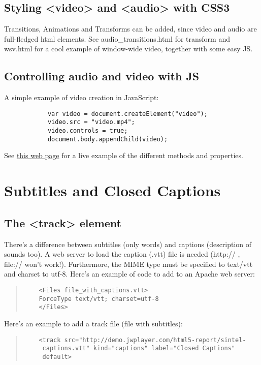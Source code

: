 \documentclass[a4paper,11pt]{book}
\begin{document}
        \subsection{Styling <video> and <audio> with CSS3}
        Transitions, Animations and Transforms can be added, since video and audio are full-fledged html elements.
        See audio\_transitions.html for transform and wsv.html for a cool example of window-wide video, together with some easy JS.

        \subsection{Controlling audio and video with JS}
        A simple example of video creation in JavaScript:
        \begin{verbatim}
            var video = document.createElement("video");
            video.src = "video.mp4";
            video.controls = true;
            document.body.appendChild(video);
        \end{verbatim}
        See \href{http://www.w3.org/2010/05/video/mediaevents.html}{this web page} for a live example of the different methods and
        properties.

\section{Subtitles and Closed Captions}
	\subsection{The <track> element}
	There's a difference between subtitles (only words) and captions (description of sounds too).
	A web server to load the caption (.vtt) file is needed (http:// , file:// won't work!). Furthermore, the MIME
	type must be specified to text/vtt and charset to utf-8. Here's an example of code to add to an Apache web server:
	\begin{verse}
	\begin{verbatim}
	<Files file_with_captions.vtt>
	ForceType text/vtt; charset=utf-8
	</Files>
	\end{verbatim}
	\end{verse}
	Here's an example to add a track file (file with subtitles):
	\begin{verse}
	\begin{verbatim}
	<track src="http://demo.jwplayer.com/html5-report/sintel-
	 captions.vtt" kind="captions" label="Closed Captions"
	 default>
	\end{verbatim}
	\end{verse}
	
\end{document}
